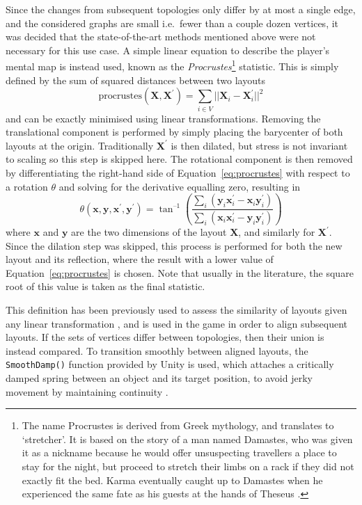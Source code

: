 Since the changes from subsequent topologies only differ by at most a single edge, and the considered graphs are small i.e.\ fewer than a couple dozen vertices, it was decided that the state-of-the-art methods mentioned above were not necessary for this use case. A simple linear equation to describe the player's mental map is instead used, known as the \emph{Procrustes}\footnote{The name Procrustes is derived from Greek mythology, and translates to `stretcher'. It is based on the story of a man named Damastes, who was given it as a nickname because he would offer unsuspecting travellers a place to stay for the night, but proceed to stretch their limbs on a rack if they did not exactly fit the bed. Karma eventually caught up to Damastes when he experienced the same fate as his guests at the hands of Theseus \citep{Cox2000}.} statistic.
This is simply defined by the sum of squared distances between two layouts
\begin{equation}
  \mathrm{procrustes}(\mathbf{X}, \mathbf{X}^\prime) = \sum_{i\in V} ||\mathbf{X}_i - \mathbf{X}_i^\prime||^2
  \label{eq:procrustes}
\end{equation}
and can be exactly minimised using linear transformations.
Removing the translational component is performed by simply placing the barycenter of both layouts at the origin. Traditionally $\mathbf{X}^\prime$ is then dilated, but stress is not invariant to scaling so this step is skipped here. The rotational component is then removed by differentiating the right-hand side of Equation~\eqref{eq:procrustes} with respect to a rotation $\theta$ and solving for the derivative equalling zero, resulting in
\begin{equation}
  \theta(\mathbf{x},\mathbf{y}, \mathbf{x^\prime}, \mathbf{y^\prime}) = 
  \tan^{\text{--}1}\left(\frac{\sum_i(\mathbf{y}_i\mathbf{x}^\prime_i-\mathbf{x}_i\mathbf{y}^\prime_i)}{\sum_i(\mathbf{x}_i\mathbf{x}^\prime_i-\mathbf{y}_i\mathbf{y}^\prime_i)}\right)
\end{equation}
where $\mathbf{x}$ and $\mathbf{y}$ are the two dimensions of the layout $\mathbf{X}$, and similarly for $\mathbf{X}^\prime$. Since the dilation step was skipped, this process is performed for both the new layout and its reflection, where the result with a lower value of Equation~\eqref{eq:procrustes} is chosen. Note that usually in the literature, the square root of this value is taken as the final statistic.

This definition has been previously used to assess the similarity of layouts given any linear transformation \citep{Ortmann2017}, and is used in the game in order to align subsequent layouts. If the sets of vertices differ between topologies, then their union is instead compared.
To transition smoothly between aligned layouts, the \texttt{SmoothDamp()} function provided by Unity is used, which attaches a critically damped spring between an object and its target position, to avoid jerky movement by maintaining continuity \citep{Kirmse2004}.


